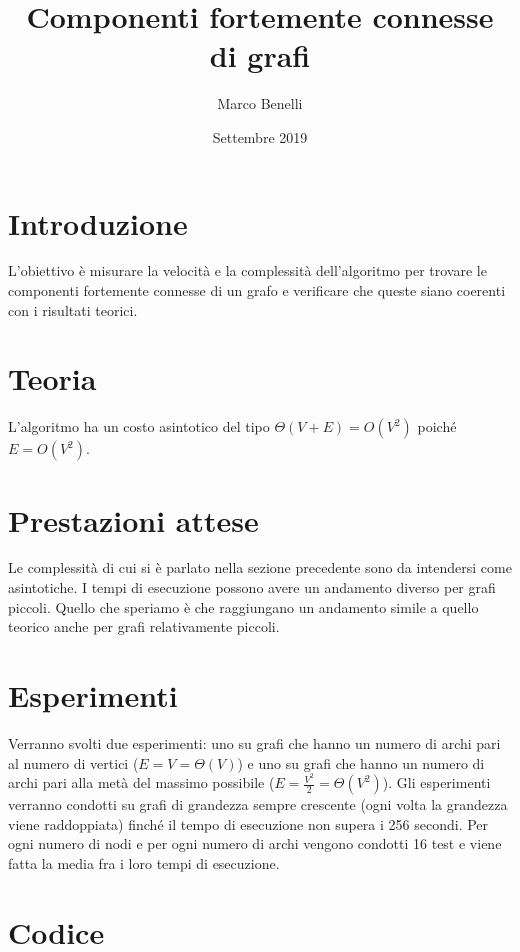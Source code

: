 \documentclass{article}
\title{Componenti fortemente connesse di grafi}
\author{Marco Benelli}
\date{Settembre 2019}
\begin{document}
\maketitle

\section{Introduzione}

L'obiettivo è misurare la velocità e la complessità dell'algoritmo per trovare le componenti fortemente connesse di un grafo e verificare che queste siano coerenti con i risultati teorici.

\section{Teoria}

L'algoritmo ha un costo asintotico del tipo $\Theta(V + E) = O(V^2)$ poiché $E = O(V^2)$.

\section{Prestazioni attese}

Le complessità di cui si è parlato nella sezione precedente sono da intendersi come asintotiche. I tempi di esecuzione possono avere un andamento diverso per grafi piccoli. Quello che speriamo è che raggiungano un andamento simile a quello teorico anche per grafi relativamente piccoli.

\section{Esperimenti}

Verranno svolti due esperimenti: uno su grafi che hanno un numero di archi pari al numero di vertici ($E = V = \Theta(V)$) e uno su grafi che hanno un numero di archi pari alla metà del massimo possibile ($E = \frac{V^2}{2} = \Theta(V^2)$). Gli esperimenti verranno condotti su grafi di grandezza sempre crescente (ogni volta la grandezza viene raddoppiata) finché il tempo di esecuzione non supera i 256 secondi. Per ogni numero di nodi e per ogni numero di archi vengono condotti 16 test e viene fatta la media fra i loro tempi di esecuzione.

\section{Codice}
\end{document}
